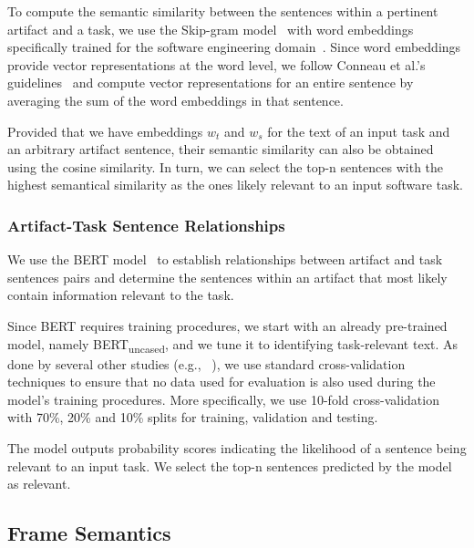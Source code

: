 To compute the semantic similarity between the sentences within a pertinent artifact and a task,
we use the Skip-gram model~\cite{Mikolov2013} with word embeddings specifically trained for the software engineering domain~\cite{Efstathiou2018}.
Since word embeddings provide vector representations at the word level, we follow Conneau et al.'s guidelines~\cite{conneau2018} 
and compute vector representations for an entire sentence by averaging the sum of the word embeddings in that sentence.


Provided that we have embeddings $w_t$ and $w_s$ for the text 
of an input task and an arbitrary artifact sentence, 
their semantic similarity can also be obtained 
using the cosine similarity. In turn, we can select the top-n sentences
with the highest semantical similarity as the ones likely relevant to an input software task.




\subsubsection{Artifact-Task Sentence Relationships}
\label{cp5:bert}


We use the BERT model~\cite{Devlin2018Bert} to establish relationships between artifact and task sentences pairs and determine 
the sentences within an artifact that most likely contain information relevant to the task.


Since BERT requires training procedures, we start with an already pre-trained model, namely BERT\textsubscript{uncased}, and we tune it to  identifying task-relevant text.
As done by several other studies (e.g., ~\cite{Chaparro2017, fucci2019, Petrosyan2015}), we use standard cross-validation techniques to ensure  that no data used for evaluation is also used
during the model's training procedures. More specifically, we use 10-fold cross-validation with 70\%, 20\% and 10\% splits for training, validation and testing. 


The model outputs probability scores indicating the likelihood of a sentence being relevant to an input task.
We select the top-n sentences predicted by the model as relevant.





\subsection{Frame Semantics}


